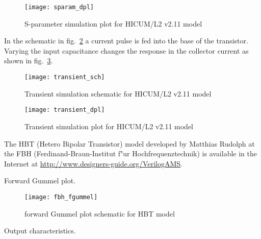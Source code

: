 \begin{figure}[ht]
\begin{center}
\texttt{[image: sparam\_dpl]}
\end{center}
\caption{S-parameter simulation plot for HICUM/L2 v2.11 model}
\label{fig:sparam_dpl}
\end{figure}
\FloatBarrier


In the schematic in fig.~\ref{fig:transient_sch} a current pulse is
fed into the base of the transistor.  Varying the input capacitance
changes the response in the collector current as shown in
fig.~\ref{fig:transient_dpl}.

\begin{figure}[ht]
\begin{center}
\texttt{[image: transient\_sch]}
\end{center}
\caption{Transient simulation schematic for HICUM/L2 v2.11 model}
\label{fig:transient_sch}
\end{figure}
\FloatBarrier

\begin{figure}[ht]
\begin{center}
\texttt{[image: transient\_dpl]}
\end{center}
\caption{Transient simulation plot for HICUM/L2 v2.11 model}
\label{fig:transient_dpl}
\end{figure}
\FloatBarrier


The HBT (Hetero Bipolar Transistor) model developed by Matthias
Rudolph at the FBH (Ferdinand-Braun-Institut f"ur Hochfrequenztechnik)
is available in the Internet at
\url{http://www.designers-guide.org/VerilogAMS}.


Forward Gummel plot.

\begin{figure}[ht]
\begin{center}
\texttt{[image: fbh\_fgummel]}
\end{center}
\caption{forward Gummel plot schematic for HBT model}
\label{fig:fbh_fgummel}
\end{figure}
\FloatBarrier


Output characteristics.

